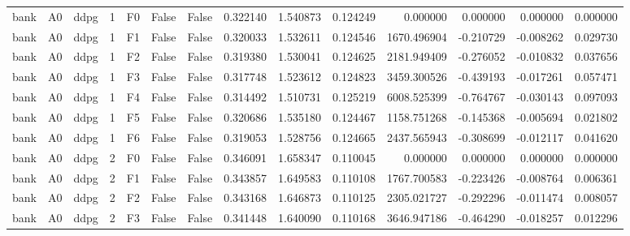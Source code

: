 \begin{tabular}{lllrlllrrrrrrr}
      bank &      A0 &      ddpg &     1 &  F0 &           False &            False &  0.322140 &  1.540873 & 0.124249 &         0.000000 &           0.000000 &        0.000000 &            0.000000 \\
      bank &      A0 &      ddpg &     1 &  F1 &           False &            False &  0.320033 &  1.532611 & 0.124546 &      1670.496904 &          -0.210729 &       -0.008262 &            0.029730 \\
      bank &      A0 &      ddpg &     1 &  F2 &           False &            False &  0.319380 &  1.530041 & 0.124625 &      2181.949409 &          -0.276052 &       -0.010832 &            0.037656 \\
      bank &      A0 &      ddpg &     1 &  F3 &           False &            False &  0.317748 &  1.523612 & 0.124823 &      3459.300526 &          -0.439193 &       -0.017261 &            0.057471 \\
      bank &      A0 &      ddpg &     1 &  F4 &           False &            False &  0.314492 &  1.510731 & 0.125219 &      6008.525399 &          -0.764767 &       -0.030143 &            0.097093 \\
      bank &      A0 &      ddpg &     1 &  F5 &           False &            False &  0.320686 &  1.535180 & 0.124467 &      1158.751268 &          -0.145368 &       -0.005694 &            0.021802 \\
      bank &      A0 &      ddpg &     1 &  F6 &           False &            False &  0.319053 &  1.528756 & 0.124665 &      2437.565943 &          -0.308699 &       -0.012117 &            0.041620 \\
      bank &      A0 &      ddpg &     2 &  F0 &           False &            False &  0.346091 &  1.658347 & 0.110045 &         0.000000 &           0.000000 &        0.000000 &            0.000000 \\
      bank &      A0 &      ddpg &     2 &  F1 &           False &            False &  0.343857 &  1.649583 & 0.110108 &      1767.700583 &          -0.223426 &       -0.008764 &            0.006361 \\
      bank &      A0 &      ddpg &     2 &  F2 &           False &            False &  0.343168 &  1.646873 & 0.110125 &      2305.021727 &          -0.292296 &       -0.011474 &            0.008057 \\
      bank &      A0 &      ddpg &     2 &  F3 &           False &            False &  0.341448 &  1.640090 & 0.110168 &      3646.947186 &          -0.464290 &       -0.018257 &            0.012296 \\

\end{tabular}
